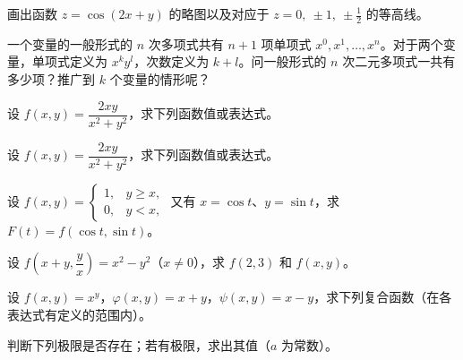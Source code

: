 \newpage
\noindent\begin{minipage}{\textwidth}
画出函数 $z=\cos(2x+y)$ 的略图以及对应于 $z=0,\ \pm1,\ \pm\tfrac12$ 的等高线。
\end{minipage}\par\vfill
\noindent\begin{minipage}{\textwidth}
一个变量的一般形式的 $n$ 次多项式共有 $n+1$ 项单项式 $x^0,x^1,\ldots,x^n$。对于两个变量，单项式定义为 $x^ky^l$，次数定义为 $k+l$。问一般形式的 $n$ 次二元多项式一共有多少项？推广到 $k$ 个变量的情形呢？
\end{minipage}\par\vfill
\noindent\begin{minipage}{\textwidth}
设 $f(x,y)=\dfrac{2xy}{x^2+y^2}$，求下列函数值或表达式。
\end{minipage}\par\vfill
\noindent\begin{minipage}{\textwidth}
设 $f(x,y)=\dfrac{2xy}{x^2+y^2}$，求下列函数值或表达式。
\end{minipage}\par\vfill
\newpage
\noindent\begin{minipage}{\textwidth}
设 $f(x,y)=\begin{cases}1,&y\ge x,\\0,&y<x,\end{cases}$ 又有 $x=\cos t$、$y=\sin t$，求 $F(t)=f(\cos t,\sin t)$。
\end{minipage}\par\vfill
\noindent\begin{minipage}{\textwidth}
设 $f\left(x+y,\dfrac yx\right)=x^2-y^2$（$x\ne0$），求 $f(2,3)$ 和 $f(x,y)$。
\end{minipage}\par\vfill
\noindent\begin{minipage}{\textwidth}
设 $f(x,y)=x^y$，$\varphi(x,y)=x+y$，$\psi(x,y)=x-y$，求下列复合函数（在各表达式有定义的范围内）。
\end{minipage}\par\vfill
\noindent\begin{minipage}{\textwidth}
判断下列极限是否存在；若有极限，求出其值（$a$ 为常数）。
\end{minipage}\par\vfill
